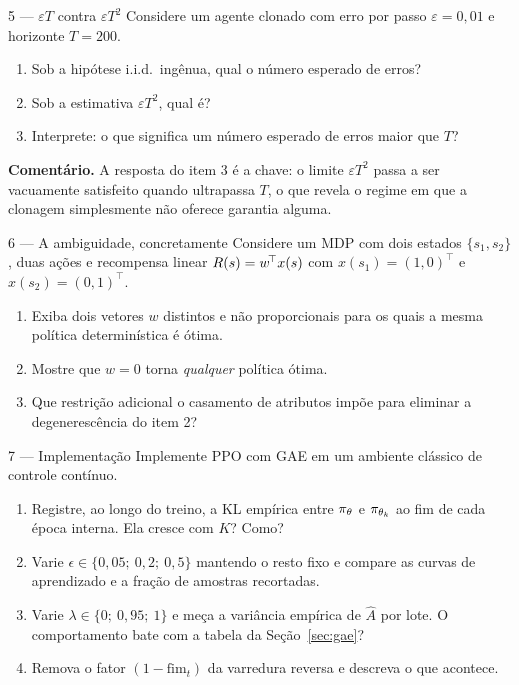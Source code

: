 \documentclass[11pt]{article}
\newcommand{\thv}{\theta}
\newcommand{\thk}{\thv_k}
\newcommand{\polth}{\pol_{\thv}}
\newcommand{\Ahat}{\hat{A}}
\newcommand{\feat}{x}
\newcommand{\wv}{w}
\begin{document}
\begin{exbox}{5 --- $\varepsilon T$ contra $\varepsilon T^2$}
  Considere um agente clonado com erro por passo $\varepsilon = 0{,}01$ e horizonte
  $T = 200$.
  \begin{enumerate}
    \item Sob a hipótese i.i.d.\ ingênua, qual o número esperado de erros?
    \item Sob a estimativa $\varepsilon T^2$, qual é?
    \item Interprete: o que significa um número esperado de erros maior que $T$?
  \end{enumerate}
  \textbf{Comentário.} A resposta do item 3 é a chave: o limite $\varepsilon T^2$ passa a
  ser vacuamente satisfeito quando ultrapassa $T$, o que revela o regime em que a clonagem
  simplesmente não oferece garantia alguma.
\end{exbox}

\begin{exbox}{6 --- A ambiguidade, concretamente}
  Considere um MDP com dois estados $\{s_1,s_2\}$, duas ações e recompensa linear
  $\rec(s) = \wv^{\!\top}\feat(s)$ com $\feat(s_1) = (1,0)^{\!\top}$ e
  $\feat(s_2) = (0,1)^{\!\top}$.
  \begin{enumerate}
    \item Exiba dois vetores $\wv$ distintos e não proporcionais para os quais a mesma
      política determinística é ótima.
    \item Mostre que $\wv = 0$ torna \emph{qualquer} política ótima.
    \item Que restrição adicional o casamento de atributos impõe para eliminar a
      degenerescência do item 2?
  \end{enumerate}
\end{exbox}

\begin{exbox}{7 --- Implementação}
  Implemente PPO com GAE em um ambiente clássico de controle contínuo.
  \begin{enumerate}
    \item Registre, ao longo do treino, a KL empírica entre $\polth$ e $\pol_{\thk}$ ao
      fim de cada época interna. Ela cresce com $K$? Como?
    \item Varie $\epsilon \in \{0{,}05;\ 0{,}2;\ 0{,}5\}$ mantendo o resto fixo e
      compare as curvas de aprendizado e a fração de amostras recortadas.
    \item Varie $\lambda \in \{0;\ 0{,}95;\ 1\}$ e meça a variância empírica de $\Ahat$
      por lote. O comportamento bate com a tabela da Seção~\ref{sec:gae}?
    \item Remova o fator $(1-\mathrm{fim}_t)$ da varredura reversa e descreva o que
      acontece.
  \end{enumerate}
\end{exbox}
\end{document}
